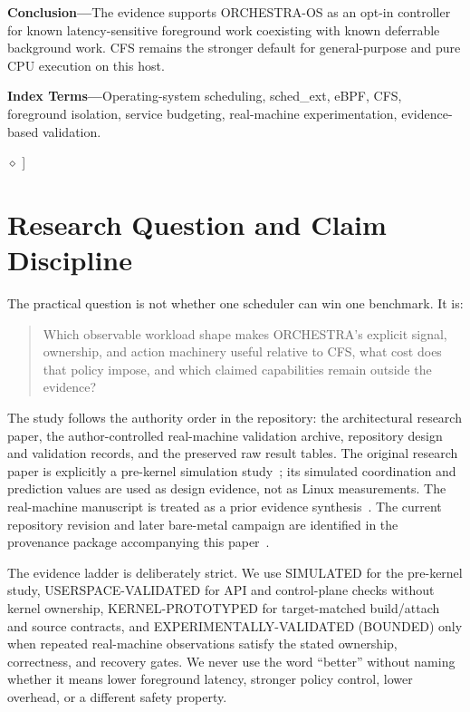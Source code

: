 \documentclass[10pt,letterpaper,twocolumn]{article}
\newcommand{\ORCH}{ORCHESTRA-OS}
\newcommand{\evidence}[1]{\textsf{\scriptsize #1}}
\begin{document}
\begin{minipage}{0.965\textwidth}
\vspace{0.16em}\noindent\textbf{Conclusion---}The evidence supports \ORCH{} as an opt-in controller for known latency-sensitive foreground work coexisting with known deferrable background work. CFS remains the stronger default for general-purpose and pure CPU execution on this host.\par
\vspace{0.18em}\noindent\textbf{Index Terms---}Operating-system scheduling, sched\_ext, eBPF, CFS, foreground isolation, service budgeting, real-machine experimentation, evidence-based validation.
\end{minipage}
\vspace{0.3em}
\hrulefill\quad$\diamond$\quad\hrulefill
\vspace{0.22em}
]

\section{Research Question and Claim Discipline}

The practical question is not whether one scheduler can win one benchmark. It is:

\begin{quote}\small
Which observable workload shape makes ORCHESTRA's explicit signal, ownership, and action machinery useful relative to CFS, what cost does that policy impose, and which claimed capabilities remain outside the evidence?
\end{quote}

The study follows the authority order in the repository: the architectural research paper, the author-controlled real-machine validation archive, repository design and validation records, and the preserved raw result tables. The original research paper is explicitly a pre-kernel simulation study~\cite{simpaper}; its simulated coordination and prediction values are used as design evidence, not as Linux measurements. The real-machine manuscript is treated as a prior evidence synthesis~\cite{valpaper}. The current repository revision and later bare-metal campaign are identified in the provenance package accompanying this paper~\cite{repo}.

The evidence ladder is deliberately strict. We use \evidence{SIMULATED} for the pre-kernel study, \evidence{USERSPACE-VALIDATED} for API and control-plane checks without kernel ownership, \evidence{KERNEL-PROTOTYPED} for target-matched build/attach and source contracts, and \evidence{EXPERIMENTALLY-VALIDATED (BOUNDED)} only when repeated real-machine observations satisfy the stated ownership, correctness, and recovery gates. We never use the word ``better'' without naming whether it means lower foreground latency, stronger policy control, lower overhead, or a different safety property.
\end{document}
